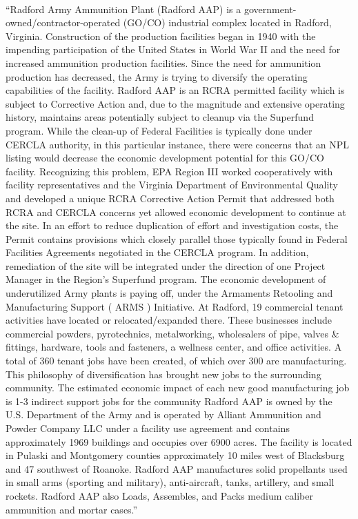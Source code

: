 \documentclass{article}
\begin{document}
\paragraph{}
``Radford Army Ammunition Plant (Radford AAP) is a government-owned/contractor-operated (GO/CO) industrial complex located in Radford, Virginia. Construction of the production facilities began in 1940 with the impending participation of the United States in World War II and the need for increased ammunition production facilities. Since the need for ammunition production has decreased, the Army is trying to diversify the operating capabilities of the facility. Radford AAP is an RCRA permitted facility which is subject to Corrective Action and, due to the magnitude and extensive operating history, maintains areas potentially subject to cleanup via the Superfund program. While the clean-up of Federal Facilities is typically done under CERCLA authority, in this particular instance, there were concerns that an NPL listing would decrease the economic development potential for this GO/CO facility. Recognizing this problem, EPA Region III worked cooperatively with facility representatives and the Virginia Department of Environmental Quality and developed a unique RCRA Corrective Action Permit that addressed both RCRA and CERCLA concerns yet allowed economic development to continue at the site. In an effort to reduce duplication of effort and investigation costs, the Permit contains provisions which closely parallel those typically found in Federal Facilities Agreements negotiated in the CERCLA program. In addition, remediation of the site will be integrated under the direction of one Project Manager in the Region's Superfund program. The economic development of underutilized Army plants is paying off, under the Armaments Retooling and Manufacturing Support ( ARMS ) Initiative. At Radford, 19 commercial tenant activities have located or relocated/expanded there. These businesses include commercial powders, pyrotechnics, metalworking, wholesalers of pipe, valves \& fittings, hardware, tools and fasteners, a wellness center, and office activities. A total of 360 tenant jobs have been created, of which over 300 are manufacturing. This philosophy of diversification has brought new jobs to the surrounding community. The estimated economic impact of each new good manufacturing job is 1-3 indirect support jobs for the community Radford AAP is owned by the U.S. Department of the Army and is operated by Alliant Ammunition and Powder Company LLC under a facility use agreement and contains approximately 1969 buildings and occupies over 6900 acres. The facility is located in Pulaski and Montgomery counties approximately 10 miles west of Blacksburg and 47 southwest of Roanoke. Radford AAP manufactures solid propellants used in small arms (sporting and military), anti-aircraft, tanks, artillery, and small rockets. Radford AAP also Loads, Assembles, and Packs medium caliber ammunition and mortar cases.”
\end{document}
